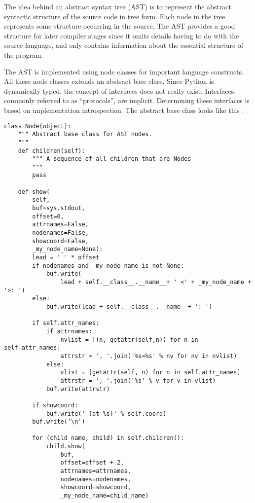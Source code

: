 The idea behind an abstract syntax tree (AST) is to represent the
abstract syntactic structure of the source code in tree form. Each
node in the tree represents some structure occurring in the source. The
AST provides a good structure for later compiler stages since it omits
details having to do with the source language, and only contains
information about the essential structure of the program.

The AST is implemented using node classes for important language
constructs. All these node classes extends an abstract base
class. Since Python is dynamically typed, the concept of interfaces
does not really exist. Interfaces, commonly referred to as
``protocols'', are implicit. Determining these interfaces is based on
implementation introspection. The abstract base class looks like
this \citep{pycparser:online}:

\begin{lstlisting}
class Node(object):
    """ Abstract base class for AST nodes.
    """
    def children(self):
        """ A sequence of all children that are Nodes
        """
        pass

    def show(
        self,
        buf=sys.stdout,
        offset=0,
        attrnames=False,
        nodenames=False,
        showcoord=False,
        _my_node_name=None):
        lead = ' ' * offset
        if nodenames and _my_node_name is not None:
            buf.write(
                lead + self.__class__.__name__+ ' <' + _my_node_name + '>: ')
        else:
            buf.write(lead + self.__class__.__name__+ ': ')

        if self.attr_names:
            if attrnames:
                nvlist = [(n, getattr(self,n)) for n in self.attr_names]
                attrstr = ', '.join('%s=%s' % nv for nv in nvlist)
            else:
                vlist = [getattr(self, n) for n in self.attr_names]
                attrstr = ', '.join('%s' % v for v in vlist)
            buf.write(attrstr)

        if showcoord:
            buf.write(' (at %s)' % self.coord)
        buf.write('\n')

        for (child_name, child) in self.children():
            child.show(
                buf,
                offset=offset + 2,
                attrnames=attrnames,
                nodenames=nodenames,
                showcoord=showcoord,
                _my_node_name=child_name)
\end{lstlisting}

